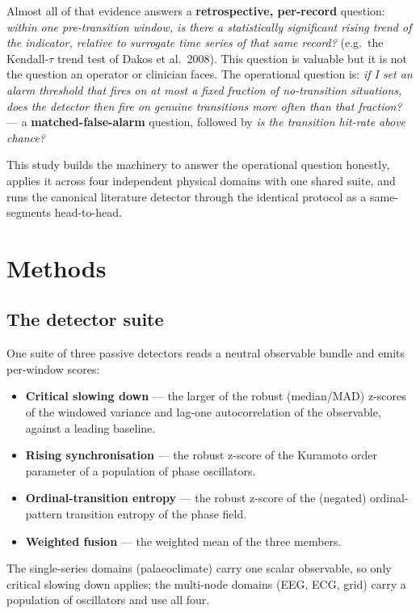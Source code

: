 \documentclass[11pt]{article}
\begin{document}
Almost all of that evidence answers a \textbf{retrospective, per-record}
question: \emph{within one pre-transition window, is there a
statistically significant rising trend of the indicator, relative to
surrogate time series of that same record?} (e.g.\ the Kendall-$\tau$
trend test of Dakos et al.\ 2008). This question is valuable but it is
not the question an operator or clinician faces. The operational
question is: \emph{if I set an alarm threshold that fires on at most a
fixed fraction of no-transition situations, does the detector then fire
on genuine transitions more often than that fraction?} --- a
\textbf{matched-false-alarm} question, followed by \emph{is the
transition hit-rate above chance?}

This study builds the machinery to answer the operational question
honestly, applies it across four independent physical domains with one
shared suite, and runs the canonical literature detector through the
identical protocol as a same-segments head-to-head.

\section{Methods}\label{sec:methods}

\subsection{The detector suite}

One suite of three passive detectors reads a neutral observable bundle
and emits per-window scores:

\begin{itemize}
  \item \textbf{Critical slowing down} --- the larger of the robust
    (median/MAD) z-scores of the windowed variance and lag-one
    autocorrelation of the observable, against a leading baseline.
  \item \textbf{Rising synchronisation} --- the robust z-score of the
    Kuramoto order parameter of a population of phase oscillators.
  \item \textbf{Ordinal-transition entropy} --- the robust z-score of the
    (negated) ordinal-pattern transition entropy of the phase field.
  \item \textbf{Weighted fusion} --- the weighted mean of the three
    members.
\end{itemize}

The single-series domains (palaeoclimate) carry one scalar observable,
so only critical slowing down applies; the multi-node domains (EEG, ECG,
grid) carry a population of oscillators and use all four.
\end{document}
